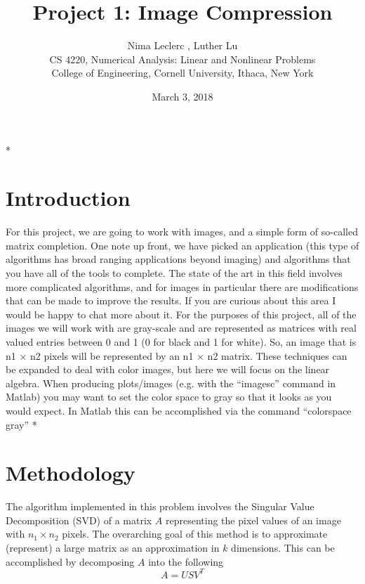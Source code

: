 \documentclass{article}
\begin{document}
 
\title{Project 1: Image Compression} 
 \author{Nima Leclerc , Luther Lu
 \\ CS 4220, Numerical Analysis: Linear and Nonlinear Problems 
 \\ College of Engineering, Cornell University, Ithaca, New York} 
\date{March 3, 2018}
\maketitle 
*\section{Introduction} 
For this project, we are going to work with images, and a simple form of so-called matrix completion.
One note up front, we have picked an application (this type of algorithms has broad ranging
applications beyond imaging) and algorithms that you have all of the tools to complete. The state
of the art in this field involves more complicated algorithms, and for images in particular there are
modifications that can be made to improve the results. If you are curious about this area I would
be happy to chat more about it.
For the purposes of this project, all of the images we will work with are gray-scale and are
represented as matrices with real valued entries between 0 and 1 (0 for black and 1 for white). So,
an image that is n1 × n2 pixels will be represented by an n1 × n2 matrix. These techniques can be
expanded to deal with color images, but here we will focus on the linear algebra. When producing
plots/images (e.g. with the “imagesc” command in Matlab) you may want to set the color space
to gray so that it looks as you would expect. In Matlab this can be accomplished via the command
“colorspace gray”
*\section{Methodology} 
The algorithm implemented in this problem involves the Singular Value Decomposition (SVD) of a matrix $A$ representing the pixel values of an image with  $n_{1} \times n _{2}$ pixels. The overarching goal of this method is to approximate (represent) a large matrix as an approximation in $k$ dimensions. This can be accomplished by decomposing $A$ into the following 
$$A =USV^{T}$$ 
\end{document}
